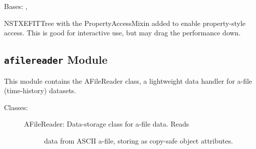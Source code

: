 \documentclass[letterpaper,10pt,english]{sphinxmanual}
\begin{document}

\begin{fulllineitems}
\label{eqtools:eqtools.NSTXEFIT.NSTXEFITTreeProp}
Bases: {\hyperref[eqtools:eqtools.NSTXEFIT.NSTXEFITTree]{}}, {\hyperref[eqtools:eqtools.core.PropertyAccessMixin]{}}

NSTXEFITTree with the PropertyAccessMixin added to enable property-style
access. This is good for interactive use, but may drag the performance down.

\end{fulllineitems}



\subsection{\texttt{afilereader} Module}
\label{eqtools:afilereader-module}\label{eqtools:module-eqtools.afilereader}
This module contains the AFileReader class, a lightweight data
handler for a-file (time-history) datasets.
\begin{description}
\item[{Classes:}] \leavevmode\begin{description}
\item[{AFileReader: Data-storage class for a-file data.  Reads}] \leavevmode
data from ASCII a-file, storing as copy-safe object
attributes.

\end{description}

\end{description}
\end{document}
